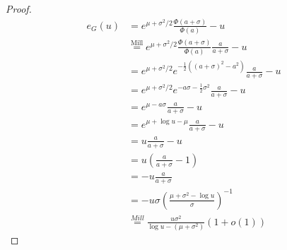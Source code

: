 \documentclass{article}
\begin{document}
\begin{proof}

\begin{align*}
    e_G(u) &= e^{\mu + \sigma^2/2} \frac{\Phi(a + \sigma)}{\Phi(a)}-u \\
    &\overset{\text{Mill}}{=} e^{\mu + \sigma^2/2}\frac{\Phi(a + \sigma)}{\Phi(a)} \frac{a}{a+\sigma} -u\\
    &=e^{\mu + \sigma^2/2} e^{-\frac{1}{2}((a + \sigma)^2 - a^2)} \frac{a}{a + \sigma} - u\\
    &= e^{\mu + \sigma^2/2} e^{- a\sigma - \frac{1}{2}\sigma^2} \frac{a}{a + \sigma} - u\\
    &= e^{\mu - a\sigma}\frac{a}{a+\sigma} - u\\
    &= e^{\mu + \log u - \mu}\frac{a}{a+\sigma}- u \\
    &= u \frac{a}{a+\sigma} - u \\
    &= u\left( \frac{a}{a + \sigma}-1\right) \\
    &= -u\frac{a}{a + \sigma} \\
    &=-u  \sigma \left( \frac{\mu + \sigma^2 - \log u}{\sigma} \right)^{-1} \\
    &\overset{Mill}{=} \frac{u\sigma^2}{\log u - (\mu +\sigma^2)}(1 + o(1))
\end{align*}


\end{proof}
\end{document}
